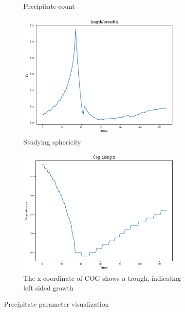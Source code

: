 \documentclass[12pt, a4paper]{report}
\begin{document}
\begin{figure}[H]
\begin{subfigure}{.45\textwidth}
  \caption{Precipitate count}
  \label{img:microstrImg}
\end{subfigure}
\begin{subfigure}{.45\textwidth}
  \centering
  \includegraphics[width=0.9\textwidth]{Pictures/Results/1lb.jpeg}
  \caption{Studying sphericity}
  \label{img:microstrImg}
\end{subfigure}
\begin{subfigure}{.45\textwidth}
  \centering
  \includegraphics[width=0.9\textwidth]{Pictures/Results/1cogx.jpeg}
  \caption{The x coordinate of COG shows a trough, indicating left sided growth}
  \label{img:microstrImg}
\end{subfigure}
\caption{Precipitate parameter visualization}
\label{fig:plotDirGrow}
\end{figure}
\end{document}
